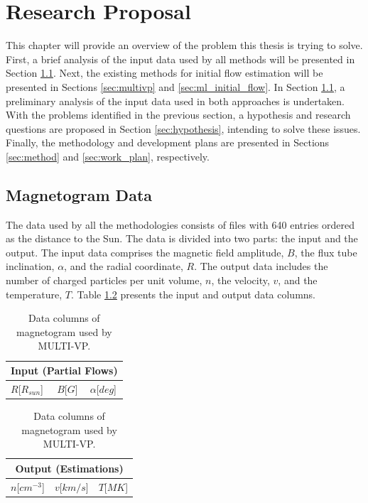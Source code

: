 \chapter{Research Proposal}\label{chap:research_proposal}

This chapter will provide an overview of the problem this thesis is trying to solve. First, a brief analysis of the input data used by all methods will be presented in Section \ref*{sec:prelim_data_analysis}. Next, the existing methods for initial flow estimation will be presented in Sections \ref{sec:multivp} and \ref{sec:ml_initial_flow}. In Section \ref{sec:prelim_data_analysis}, a preliminary analysis of the input data used in both approaches is undertaken. With the problems identified in the previous section, a hypothesis and research questions are proposed in Section \ref{sec:hypothesis}, intending to solve these issues. Finally, the methodology and development plans are presented in Sections \ref{sec:method} and \ref{sec:work_plan}, respectively.

\section{Magnetogram Data}\label{sec:prelim_data_analysis}

The data used by all the methodologies consists of files with 640 entries ordered as the distance to the Sun. The data is divided into two parts: the input and the output. The input data comprises the magnetic field amplitude, $B$, the flux tube inclination, $\alpha$, and the radial coordinate, $R$. The output data includes the number of charged particles per unit volume, $n$, the velocity, $v$, and the temperature, $T$. Table \ref{tab:multivp_columns} presents the input and output data columns.

\begin{table}[ht]
    \caption{Data columns of magnetogram used by MULTI-VP.}
    \label{tab:multivp_columns}
    \begin{subtable}[h]{0.32\textwidth}
        \centering
        \begin{tabular}{lcc}
        \hline
        \multicolumn{3}{c}{Input (Partial Flows)}                              \\ \hline
        $R${[}$R_{sun}${]} & $B${[}$G${]} & $\alpha${[}$deg${]} \\ \hline
        \end{tabular}
    \end{subtable}
    \begin{subtable}[h]{0.32\textwidth}
        \centering
        \begin{tabular}{ccc}
        \hline
        \multicolumn{3}{c}{Output (Estimations)}                           \\ \hline
        $n${[}$cm^{-3}${]} & $v${[}$km/s${]} & $T${[}$MK${]} \\ \hline
        \end{tabular}
    \end{subtable}
\end{table}

